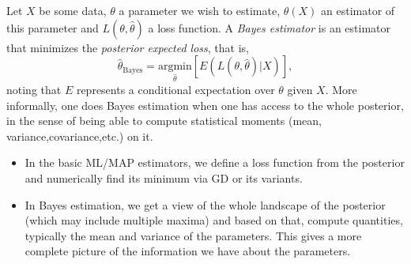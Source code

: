 \documentclass{article}
\begin{document}
Let $X$ be some data, $\theta$ a parameter we wish to estimate, $\hat{\theta}(X)$ an estimator of this parameter and $L(\theta,\hat{\theta})$ a loss function. A \emph{Bayes estimator} is an estimator that minimizes the \emph{posterior expected loss}, that is,
\begin{equation}
    \hat{\theta}_{\text{Bayes}} = \underset{\hat{\theta}}{\text{argmin}}\left[
    E(L(\theta,\hat{\theta}) | X)\right],
\end{equation}
noting that $E$ represents a conditional expectation over $\theta$ given $X$.
More informally, one does Bayes estimation when one has access to the whole posterior, in the sense of being able to compute statistical moments (mean, variance,covariance,etc.) on it.
\begin{itemize}
    \item In the basic ML/MAP estimators, we define a loss function from the posterior and numerically find its minimum via GD or its variants.
    \item In Bayes estimation, we get a view of the whole landscape of the posterior (which may include multiple maxima) and based on that, compute quantities, typically the mean and variance of the parameters. This gives a more complete picture of the information we have about the parameters.
\end{itemize}
\end{document}
